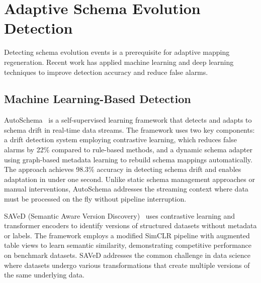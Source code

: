 \section{Adaptive Schema Evolution Detection}
\label{sec:related-adaptive-detection}

Detecting schema evolution events is a prerequisite for adaptive mapping regeneration. Recent work has applied machine learning and deep learning techniques to improve detection accuracy and reduce false alarms.

\subsection{Machine Learning-Based Detection}

AutoSchema~\cite{autoschema2024} is a self-supervised learning framework that detects and adapts to schema drift in real-time data streams. The framework uses two key components: a drift detection system employing contrastive learning, which reduces false alarms by 22\% compared to rule-based methods, and a dynamic schema adapter using graph-based metadata learning to rebuild schema mappings automatically. The approach achieves 98.3\% accuracy in detecting schema drift and enables adaptation in under one second. Unlike static schema management approaches or manual interventions, AutoSchema addresses the streaming context where data must be processed on the fly without pipeline interruption.

SAVeD (Semantic Aware Version Discovery)~\cite{saved2025} uses contrastive learning and transformer encoders to identify versions of structured datasets without metadata or labels. The framework employs a modified SimCLR pipeline with augmented table views to learn semantic similarity, demonstrating competitive performance on benchmark datasets. SAVeD addresses the common challenge in data science where datasets undergo various transformations that create multiple versions of the same underlying data.

%


